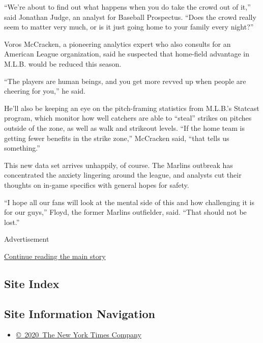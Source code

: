``We're about to find out what happens when you do take the crowd out of
it,'' said Jonathan Judge, an analyst for Baseball Prospectus. ``Does
the crowd really seem to matter very much, or is it just going home to
your family every night?''

Voros McCracken, a pioneering analytics expert who also consults for an
American League organization, said he suspected that home-field
advantage in M.L.B. would be reduced this season.

``The players are human beings, and you get more revved up when people
are cheering for you,'' he said.

He'll also be keeping an eye on the pitch-framing statistics from
M.L.B.'s Statcast program, which monitor how well catchers are able to
``steal'' strikes on pitches outside of the zone, as well as walk and
strikeout levels. ``If the home team is getting fewer benefits in the
strike zone,'' McCracken said, ``that tells us something.''

This new data set arrives unhappily, of course. The Marlins outbreak has
concentrated the anxiety lingering around the league, and analysts cut
their thoughts on in-game specifics with general hopes for safety.

``I hope all our fans will look at the mental side of this and how
challenging it is for our guys,'' Floyd, the former Marlins outfielder,
said. ``That should not be lost.''

Advertisement

\protect\hyperlink{after-bottom}{Continue reading the main story}

\hypertarget{site-index}{%
\subsection{Site Index}\label{site-index}}

\hypertarget{site-information-navigation}{%
\subsection{Site Information
Navigation}\label{site-information-navigation}}

\begin{itemize}
\tightlist
\item
  \href{https://help.nytimes3xbfgragh.onion/hc/en-us/articles/115014792127-Copyright-notice}{©~2020~The
  New York Times Company}
\end{itemize}

